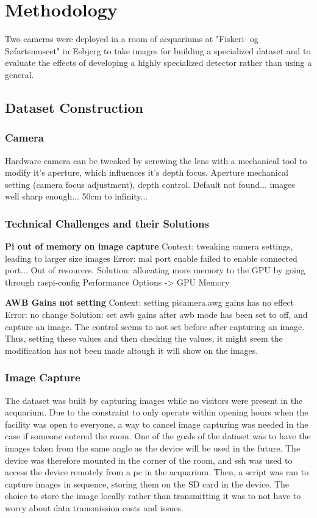 \section{Methodology}
Two cameras were deployed in a room of acquariums at "Fiskeri- og Søfartsmuseet" in Esbjerg to take images for building a specialized dataset and to evaluate the effects of developing a highly specialized detector rather than using a general.

\subsection{Dataset Construction}
\subsubsection{Camera}
Hardware camera can be tweaked by screwing the lens with a mechanical tool to modify it's aperture, which influences it's depth focus. 
Aperture mechanical setting (camera focus adjustment), depth control. Default not found... images well sharp enough... 50cm to infinity...

\subsubsection{Technical Challenges and their Solutions}
\textbf{Pi out of memory on image capture}
Context: tweaking camera settings, leading to larger size images
Error: mal port enable failed to enable connected port... Out of resources.
Solution: allocating more memory to the GPU by going through raspi-config Performance Options -> GPU Memory

\textbf{AWB Gains not setting}
Context: setting picamera.awg gains has no effect
Error: no change 
Solution: set awb gains after awb mode has been set to off, and capture an image. The control seems to not set before after capturing an image. Thus, setting these values and then checking the values, it might seem the modification has not been made altough it will show on the images.

\subsubsection{Image Capture}
The dataset was built by capturing images while no visitors were present in the acquarium. Due to the constraint to only operate within opening hours when the facility was open to everyone, a way to cancel image capturing was needed in the case if someone entered the room. One of the goals of the dataset was to have the images taken from the same angle as the device will be used in the future. The device was therefore mounted in the corner of the room, and ssh was used to access the device remotely from a pc in the acquarium. Then, a script was ran to capture images in sequence, storing them on the SD card in the device. The choice to store the image locally rather than transmitting it was to not have to worry about data transmission costs and issues. 

